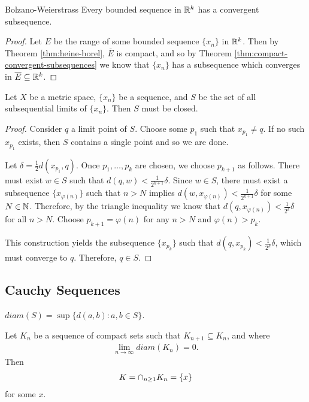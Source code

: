 \begin{thm}{Bolzano-Weierstrass}\label{thm:bolzano-weierstrass}\proofbreak
    Every bounded sequence in $\mathbb{R}^{k}$ has a convergent subsequence.
\end{thm}

\begin{proof}
    Let $E$ be the range of some bounded sequence $\{x_n\}$ in $\mathbb{R}^k$. Then by Theorem \ref{thm:heine-borel}, $\overline{E}$ is compact, and so by Theorem \ref{thm:compact-convergent-subsequences} we know that $\{x_n\}$ has a subsequence which converges in $\overline{E} \subseteq \mathbb{R}^k$.
\end{proof}

\begin{thm}
    Let $X$ be a metric space, $\{x_n\}$ be a sequence, and $S$ be the set of all subsequential limits of $\{x_n\}$. Then $S$ must be closed.
\end{thm}

\begin{proof}
    Consider $q$ a limit point of $S$. Choose some $p_1$ such that $x_{p_1} \neq q$. If no such $x_{p_1}$ exists, then $S$ contains a single point and so we are done.

    Let $\delta = \frac{1}{2}d(x_{p_1}, q)$. Once $p_1, \ldots, p_k$ are chosen, we choose $p_{k+1}$ as follows. There must exist $w \in S$ such that $d(q, w) < \frac{1}{2^{k+1}}\delta$. Since $w \in S$, there must exist a subsequence $\{x_{\varphi(n)}\}$ such that $n > N$ implies $d(w, x_{\varphi(n)}) < \frac{1}{2^{k+1}}\delta$ for some $N \in \mathbb{N}$. Therefore, by the triangle inequality we know that $d(q, x_{\varphi(n)}) < \frac{1}{2^{k}}\delta$ for all $n > N$. Choose $p_{k+1} = \varphi(n)$ for any $n > N$ and $\varphi(n) > p_k$.

    This construction yields the subsequence $\{x_{p_k}\}$ such that $d(q, x_{p_k}) < \frac{1}{2^{k}}\delta$, which must converge to $q$. Therefore, $q \in S$.
\end{proof}

\subsection{Cauchy Sequences}

\begin{defn}
    $diam(S) = \sup \{d(a, b) : a, b \in S\}$.
\end{defn}

\begin{thm}
    Let $K_n$ be a sequence of compact sets such that $K_{n+1} \subseteq K_n$, and where
    \begin{align*}
        \lim_{n\to\infty}diam(K_n) = 0.
    \end{align*}
    Then
    \begin{align*}
        K = \cap_{n\geq 1}K_n = \{x\}
    \end{align*}
    for some $x$.
\end{thm}

